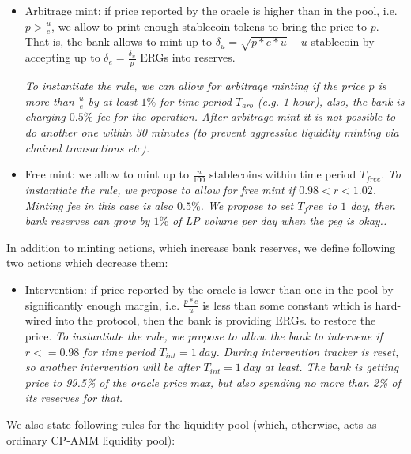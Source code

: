 \documentclass{article}   %
\newcommand{\bc}{ERG}
\newcommand{\sct}{stablecoin}
\begin{document}
\begin{itemize}
  \item{Arbitrage mint: } if price reported by the oracle is higher than in the pool, i.e. $p > \frac{u}{e}$, we allow to print enough \sct{} tokens to bring the price to $p$. That is, the bank allows to mint up to $\delta_u = \sqrt{p*e*u}-u$ \sct{} by accepting up to $\delta_e = \frac{\delta_u}{p}$ \bc{}s into reserves. 

  \em{To instantiate the rule, we can allow for arbitrage minting if the price $p$ is more than $\frac{u}{e}$ by at least $1\%$ for time period $T_{arb}$ (e.g. 1 hour), also, the bank is charging $0.5\%$ fee for the operation. After arbitrage mint it is not possible to do another one within 30 minutes (to prevent aggressive liquidity minting via chained transactions etc).} 

  \item{Free mint: } we allow to mint up to $\frac{u}{100}$ \sct{}s within time period $T_{free}$. 
  \em{To instantiate the rule, we propose to allow for free mint if $0.98 < r < 1.02$. Minting fee in this case is also $0.5\%$. We propose to set $T_free$ to $1$ day, then bank reserves can grow by $1\%$ of LP volume per day when the peg is okay.}. 
\end{itemize}  

In addition to minting actions, which increase bank reserves, we define following two actions which decrease them: 

\begin{itemize}
   \item{Intervention: } if price reported by the oracle is lower than one in the pool by significantly enough margin, i.e. $\frac{p*e}{u}$ is less than some constant which is hard-wired into the protocol, then the bank is providing \bc{}s. to restore the price.
   \em{To instantiate the rule, we propose to allow the bank to intervene if $r <= 0.98$ for time period $T_{int} = 1 {\ day}$.
       During intervention tracker is reset, so another intervention will be after $T_{int} = 1 {\ day}$ at least. The bank is getting 
       price to 99.5\% of the oracle price max, but also spending no more than 2\% of its reserves for that.}
\end{itemize}


We also state following rules for the liquidity pool (which, otherwise, acts as ordinary CP-AMM liquidity pool): 
\end{document}
